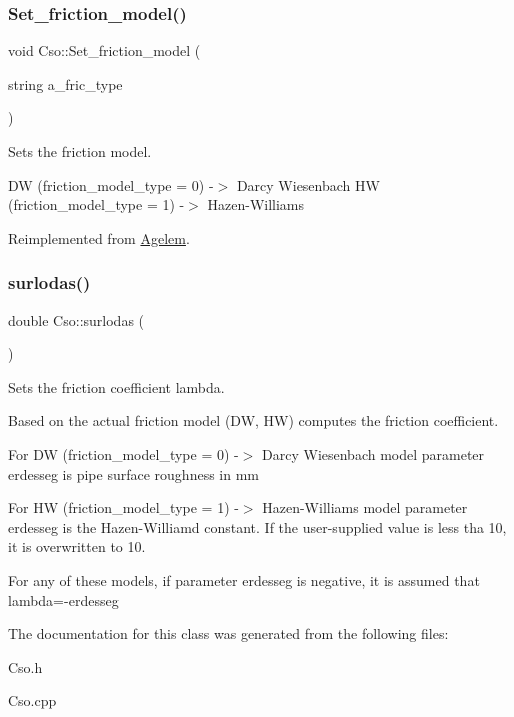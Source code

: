 \subsubsection{\texorpdfstring{Set\+\_\+friction\+\_\+model()}{Set\_friction\_model()}}
{\footnotesize\ttfamily void Cso\+::\+Set\+\_\+friction\+\_\+model (\begin{DoxyParamCaption}\item[{string}]{a\+\_\+fric\+\_\+type }\end{DoxyParamCaption})\hspace{0.3cm}{\ttfamily [virtual]}}



Sets the friction model. 

DW (friction\+\_\+model\+\_\+type = 0) -\/$>$ Darcy Wiesenbach HW (friction\+\_\+model\+\_\+type = 1) -\/$>$ Hazen-\/\+Williams 

Reimplemented from \hyperlink{class_agelem}{Agelem}.

\mbox{\label{class_cso_a01d6ba01b924fe317638fe196a139d1f}} 
\subsubsection{\texorpdfstring{surlodas()}{surlodas()}}
{\footnotesize\ttfamily double Cso\+::surlodas (\begin{DoxyParamCaption}{ }\end{DoxyParamCaption})}



Sets the friction coefficient lambda. 

Based on the actual friction model (DW, HW) computes the friction coefficient.

For DW (friction\+\_\+model\+\_\+type = 0) -\/$>$ Darcy Wiesenbach model parameter \textquotesingle{}erdesseg\textquotesingle{} is pipe surface roughness in mm

For HW (friction\+\_\+model\+\_\+type = 1) -\/$>$ Hazen-\/\+Williams model parameter \textquotesingle{}erdesseg\textquotesingle{} is the Hazen-\/\+Williamd constant. If the user-\/supplied value is less tha 10, it is overwritten to 10.

For any of these models, if parameter erdesseg is negative, it is assumed that lambda=-\/erdesseg 

The documentation for this class was generated from the following files\+:\begin{DoxyCompactItemize}
\item 
Cso.\+h\item 
Cso.\+cpp\end{DoxyCompactItemize}
